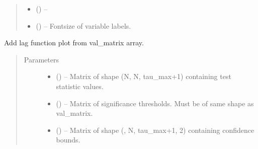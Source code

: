 \documentclass[letterpaper,10pt,english]{sphinxmanual}
\begin{document}
\begin{fulllineitems}
\begin{quote}
\begin{description}
\begin{itemize}
\item {} 
 (\sphinxstyleliteralemphasis{, }\sphinxstyleliteralemphasis{ (}\sphinxstyleliteralemphasis{)}\sphinxstyleliteralemphasis{}) -- 

\item {} 
 (\sphinxstyleliteralemphasis{, }\sphinxstyleliteralemphasis{ (}\sphinxstyleliteralemphasis{)}\sphinxstyleliteralemphasis{}) -- Fontsize of variable labels.

\end{itemize}

\end{description}\end{quote}

\begin{fulllineitems}
\label{\detokenize{index:tigramite.plotting.setup_matrix.add_lagfuncs}}
Add lag function plot from val\_matrix array.
\begin{quote}\begin{description}
\item[{Parameters}] \leavevmode\begin{itemize}
\item {} 
 () -- Matrix of shape (N, N, tau\_max+1) containing test statistic values.

\item {} 
 (\sphinxstyleliteralemphasis{, }\sphinxstyleliteralemphasis{ (}\sphinxstyleliteralemphasis{)}\sphinxstyleliteralemphasis{}) -- Matrix of significance thresholds. Must be of same shape as
val\_matrix.

\item {} 
 (\sphinxstyleliteralemphasis{, }\sphinxstyleliteralemphasis{ (}\sphinxstyleliteralemphasis{)}\sphinxstyleliteralemphasis{}) -- Matrix of shape (, N, tau\_max+1, 2) containing confidence bounds.


\end{itemize}
\end{description}
\end{quote}
\end{fulllineitems}
\end{fulllineitems}
\end{document}
